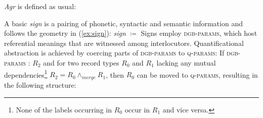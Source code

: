 \documentclass[output=paper
 	        ,biblatex
                ,babelshorthands
                ,newtxmath
                ,draftmode
                ,colorlinks, citecolor=brown
]{langscibook}
\begin{document}
\emph{Agr} is defined as usual:
%
\ea
{}
\z 



A basic \emph{sign} is a pairing of phonetic, syntactic and semantic information and follows the geometry in (\ref{ex:sign}): 
%
\ea \label{ex:sign}
\emph{sign} $\coloneqq$ 
\z
%
Signs employ \textsc{dgb-params}, which host referential meanings that are witnessed among interlocutors. 
%
Quantificational abstraction is achieved by coercing parts of \textsc{dgb-params} to \textsc{q-params}:
%
\ea
If \textsc{dgb-params} : $R_2$ and for two record types $R_0$ and $R_1$ lacking any mutual dependencies\footnote{None of the labels occurring in $R_0$ occur in $R_1$ and vice versa.}
$R_2 = R_0 \wedge_{merge} R_1$,
then $R_0$ can be moved to \textsc{q-params}, resulting in the following structure: \par\medskip 
 
\end{document}
